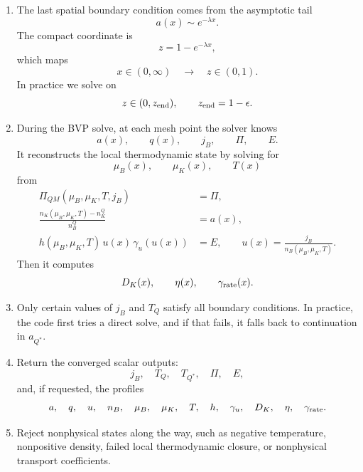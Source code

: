 \documentclass[11pt]{article}
\begin{document}
\begin{enumerate}
\item The last spatial boundary condition comes from the asymptotic tail
\begin{equation}
a(x)\sim e^{-\lambda x}.
\end{equation}
The compact coordinate is
\begin{equation}
z=1-e^{-\lambda x},
\end{equation}
which maps
\begin{equation}
x\in(0,\infty)
\quad\to\quad
z\in(0,1).
\end{equation}
In practice we solve on
\begin{equation}
z\in(0,z_{\rm end}),
\qquad
z_{\rm end}=1-\epsilon.
\end{equation}

\item During the BVP solve, at each mesh point the solver knows
\begin{equation}
a(x),\qquad q(x),\qquad j_B,\qquad \Pi,\qquad E.
\end{equation}
It reconstructs the local thermodynamic state by solving for
\begin{equation}
\mu_B(x),\qquad \mu_K(x),\qquad T(x)
\end{equation}
from
\begin{align}
\Pi_{QM}(\mu_B,\mu_K,T,j_B)
&=
\Pi,
\\
\frac{n_K(\mu_B,\mu_K,T)-n_K^Q}{n_B^Q}
&=
a(x),
\\
h(\mu_B,\mu_K,T)\,u(x)\,\gamma_u(u(x))
&=
E,
\qquad
u(x)=\frac{j_B}{n_B(\mu_B,\mu_K,T)}.
\end{align}
Then it computes
\begin{equation}
D_K(x),\qquad \eta(x),\qquad \gamma_{\rm rate}(x).
\end{equation}

\item Only certain values of $j_B$ and $T_Q$ satisfy all boundary conditions. In practice, the code first tries a direct solve, and if that fails, it falls back to continuation in $a_{Q^\ast}$.

\item Return the converged scalar outputs:
\begin{equation}
j_B,\quad T_Q,\quad T_{Q^\ast},\quad \Pi,\quad E,
\end{equation}
and, if requested, the profiles
\begin{equation}
a,\quad q,\quad u,\quad n_B,\quad \mu_B,\quad \mu_K,\quad T,\quad h,\quad \gamma_u,\quad D_K,\quad \eta,\quad \gamma_{\rm rate}.
\end{equation}

\item Reject nonphysical states along the way, such as negative temperature, nonpositive density, failed local thermodynamic closure, or nonphysical transport coefficients.
\end{enumerate}
\end{document}
